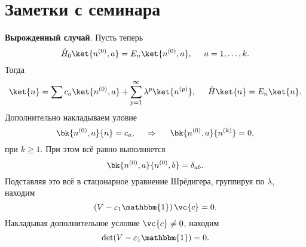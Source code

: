 \section*{Заметки с семинара}

\textbf{Вырожденный случай}. Пусть теперь
\begin{equation*}
    \hat{H}_0 \ket{n^{(0)}, a} = E_n \ket{n^{(0)}, a},\hspace{5 mm} 
    a = 1, \ldots, k.
\end{equation*}
Тогда
\begin{equation*}
    \ket{n} = \sum c_a \ket{n^{(0)}, a} + \sum_{p=1}^{\infty} \lambda^p \ket{n^{(p)}},
    \hspace{5 mm} 
    \hat{H} \ket{n} = E_n \ket{n}.
\end{equation*}
Дополнительно накладываем уловие
\begin{equation*}
    \bk{n^{(0)}, a}{n} = c_a,
    \hspace{0.5cm} \Rightarrow \hspace{0.5cm}
    \bk{n^{(0)}, a}{n^{(k)}} = 0,
\end{equation*}
при $k \geq 1$. При этом всё равно выполняется
\begin{equation*}
    \bk{n^{(0)}, a}{n^{(0)}, b} = \delta_{ab}.
\end{equation*}
Подставляя это всё в стацонарное уравнение Шрёдигера, группируя по $\lambda$, находим
\begin{equation*}
    \left(V - \varepsilon_1 \mathbbm{1}\right) \vc{c} = 0.
\end{equation*}
Накладывая дополнительное условие $\vc{c} \neq 0$, находим
\begin{equation*}
    \det(V - \varepsilon_1 \mathbbm{1}) = 0.
\end{equation*}

